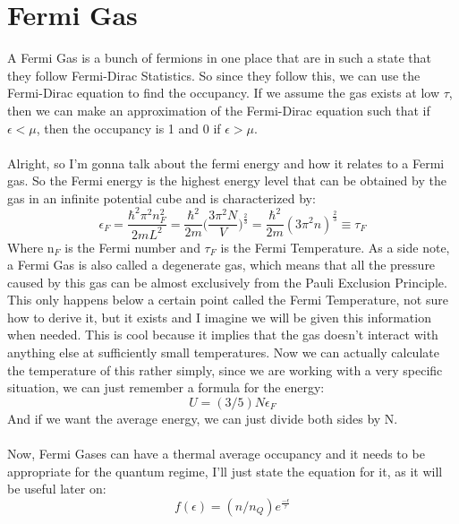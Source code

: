 \documentclass[arial]{article}
\begin{document}
\section*{Fermi Gas}
A Fermi Gas is a bunch of fermions in one place that are in such a state that they follow Fermi-Dirac Statistics. So since they follow this, we can use the Fermi-Dirac equation to find the occupancy. If we assume the gas exists at low $\tau$, then we can make an approximation of the Fermi-Dirac equation such that if $\epsilon<\mu$, then the occupancy is 1 and 0 if $\epsilon>\mu$.\\
\\
Alright, so I'm gonna talk about the fermi energy and how it relates to a Fermi gas. So the Fermi energy is the highest energy level that can be obtained by the gas in an infinite potential cube and is characterized by:
\begin{equation}
\epsilon_F=\frac{\hbar^2 \pi^2 n_F^2}{2mL^2}=\frac{\hbar^2}{2m}\bigg(\frac{3\pi^2N}{V}\bigg)^\frac{2}{3}=\frac{\hbar^2}{2m}(3\pi^2n)^\frac{2}{3}\equiv\tau_F
\end{equation}
Where n$_F$ is the Fermi number and $\tau_F$ is the Fermi Temperature. As a side note, a Fermi Gas is also called a degenerate gas, which means that all the pressure caused by this gas can be almost exclusively from the Pauli Exclusion Principle. This only happens below a certain point called the Fermi Temperature, not sure how to derive it, but it exists and I imagine we will be given this information when needed. This is cool because it implies that the gas doesn't interact with anything else at sufficiently small temperatures. Now we can actually calculate the temperature of this rather simply, since we are working with a very specific situation, we can just remember a formula for the energy:
\begin{equation}
U=(3/5)N\epsilon_F
\end{equation}
And if we want the average energy, we can just divide both sides by N.\\
\\
Now, Fermi Gases can have a thermal average occupancy and it needs to be appropriate for the quantum regime, I'll just state the equation for it, as it will be useful later on:
\begin{equation}
f(\epsilon)=(n/n_Q)e^\frac{-\epsilon}{\tau}
\end{equation}
\end{document}
